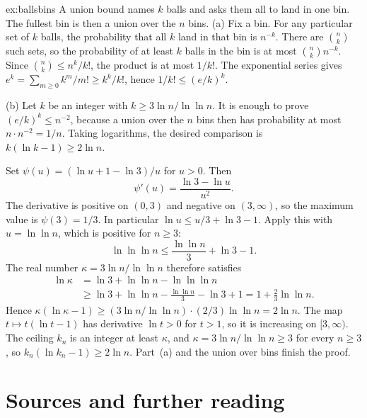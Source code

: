 \begin{solution}{ex:ballsbins}
\idea A union bound names $k$ balls and asks them all to land in one bin. The fullest bin is then a union over the $n$ bins.
\writeup (a) Fix a bin. For any particular set of $k$ balls, the probability that all $k$ land in that bin is $n^{-k}$. There are $\binom nk$ such sets, so the probability of at least $k$ balls in the bin is at most $\binom nk n^{-k}$. Since $\binom nk\le n^k/k!$, the product is at most $1/k!$. The exponential series gives $e^k=\sum_{m\ge0}k^m/m!\ge k^k/k!$, hence $1/k!\le(e/k)^k$.

(b) Let $k$ be an integer with $k\ge 3\ln n/\ln\ln n$. It is enough to prove $(e/k)^k\le n^{-2}$, because a union over the $n$ bins then has probability at most $n\cdot n^{-2}=1/n$. Taking logarithms, the desired comparison is $k(\ln k-1)\ge 2\ln n$.

Set $\psi(u)=(\ln u+1-\ln 3)/u$ for $u>0$. Then
\[
 \psi'(u)=\frac{\ln 3-\ln u}{u^2}.
\]
The derivative is positive on $(0,3)$ and negative on $(3,\infty)$, so the maximum value is $\psi(3)=1/3$. In particular $\ln u\le u/3+\ln3-1$. Apply this with $u=\ln\ln n$, which is positive for $n\ge3$:
\[
 \ln\ln\ln n\le\frac{\ln\ln n}3+\ln3-1.
\]
The real number $\kappa=3\ln n/\ln\ln n$ therefore satisfies
\begin{align*}
 \ln\kappa
 &=\ln3+\ln\ln n-\ln\ln\ln n\\
 &\ge\ln3+\ln\ln n-\frac{\ln\ln n}3-\ln3+1
 =1+\frac23\ln\ln n.
\end{align*}
Hence $\kappa(\ln\kappa-1)\ge(3\ln n/\ln\ln n)\cdot(2/3)\ln\ln n=2\ln n$. The map $t\mapsto t(\ln t-1)$ has derivative $\ln t>0$ for $t>1$, so it is increasing on $[3,\infty)$. The ceiling $k_n$ is an integer at least $\kappa$, and $\kappa=3\ln n/\ln\ln n\ge3$ for every $n\ge3$, so $k_n(\ln k_n-1)\ge2\ln n$. Part~(a) and the union over bins finish the proof.
\end{solution}

\section*{Sources and further reading}

